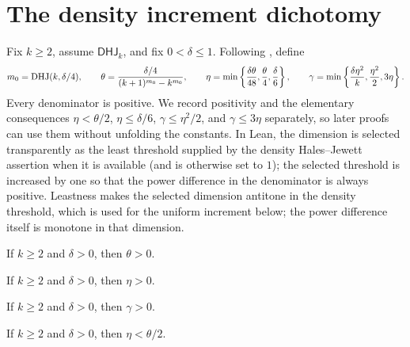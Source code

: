 \chapter{The density increment dichotomy}
\label{chap:increment}

Fix $k\geq2$, assume $\mathsf{DHJ}_k$, and fix $0<\delta\leq1$.  Following \cite{DKT}, define
\begin{equation}
\label{eq:main-constants}
 m_0=\operatorname{DHJ}(k,\delta/4),\qquad
 \theta=\frac{\delta/4}{(k+1)^{m_0}-k^{m_0}},\qquad
 \eta=\min\left\{\frac{\delta\theta}{48},\frac\theta4,\frac\delta6\right\},\qquad
 \gamma=\min\left\{\frac{\delta\eta^2}{k},\frac{\eta^2}{2},3\eta\right\}.
\end{equation}
Every denominator is positive.  We record positivity and the elementary consequences
$\eta<\theta/2$, $\eta\leq\delta/6$, $\gamma\leq\eta^2/2$, and $\gamma\leq3\eta$ separately, so
later proofs can use them without unfolding the constants.
In Lean, the dimension is selected transparently as the least threshold supplied by the density
Hales--Jewett assertion when it is available (and is otherwise set to $1$); the selected threshold
is increased by one so that the power difference in the denominator is always positive.  Leastness
makes the selected dimension antitone in the density threshold, which is used for the uniform
increment below; the power difference itself is monotone in that dimension.

\begin{lemma}
\label{lem:theta-pos}
If $k\geq2$ and $\delta>0$, then $\theta>0$.
\end{lemma}

\begin{lemma}
\label{lem:eta-pos}
If $k\geq2$ and $\delta>0$, then $\eta>0$.
\end{lemma}

\begin{lemma}
\label{lem:gamma-pos}
If $k\geq2$ and $\delta>0$, then $\gamma>0$.
\end{lemma}

\begin{lemma}
\label{lem:eta-lt-theta-div-two}
If $k\geq2$ and $\delta>0$, then $\eta<\theta/2$.
\end{lemma}


